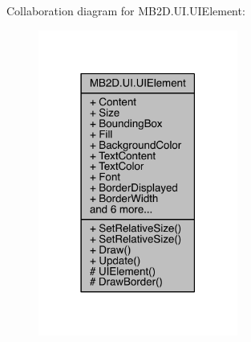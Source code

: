 Collaboration diagram for M\+B2\+D.\+U\+I.\+U\+I\+Element\+:\nopagebreak
\begin{figure}[H]
\begin{center}
\leavevmode
\includegraphics[width=186pt]{class_m_b2_d_1_1_u_i_1_1_u_i_element__coll__graph}
\end{center}
\end{figure}
